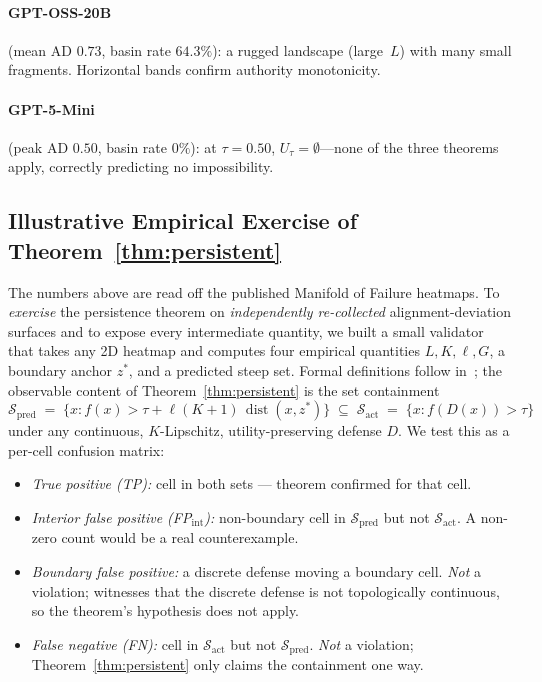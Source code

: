 \documentclass[11pt]{article}
\newcommand{\dist}{\operatorname{dist}}
\begin{document}
\paragraph{GPT-OSS-20B} (mean AD $0.73$, basin rate $64.3\%$): a
rugged landscape (large~$L$) with many small fragments. Horizontal
bands confirm authority monotonicity.

\paragraph{GPT-5-Mini} (peak AD $0.50$, basin rate $0\%$): at
$\tau = 0.50$, $U_\tau = \emptyset$---none of the three theorems
apply, correctly predicting no impossibility.


\subsection{Illustrative Empirical Exercise of Theorem~\ref{thm:persistent}}
\label{sec:live-validation}

The numbers above are read off the published Manifold of Failure
heatmaps. To \emph{exercise} the persistence theorem on
\emph{independently re-collected} alignment-deviation surfaces and
to expose every intermediate quantity, we built a small validator
that takes any 2D heatmap and computes four empirical quantities
$L, K, \ell, G$, a boundary anchor $z^{*}$, and a predicted
steep set. Formal definitions follow in~;
the observable content of Theorem~\ref{thm:persistent} is the
set containment
\[
\mathcal{S}_{\text{pred}} \;=\;
\bigl\{x : f(x) > \tau + \ell(K{+}1)\,\dist(x, z^{*})\bigr\}
\;\subseteq\;
\mathcal{S}_{\text{act}} \;=\; \bigl\{x : f(D(x)) > \tau\bigr\}
\]
under any continuous, $K$-Lipschitz, utility-preserving defense
$D$. We test this as a per-cell confusion matrix:

\begin{itemize}[nosep]
  \item \emph{True positive (TP):} cell in both sets — theorem
    confirmed for that cell.
  \item \emph{Interior false positive (FP$_{\mathrm{int}}$):} non-boundary
    cell in $\mathcal{S}_{\text{pred}}$ but not $\mathcal{S}_{\text{act}}$.
    A non-zero count would be a real counterexample.
  \item \emph{Boundary false positive:} a discrete defense moving a
    boundary cell. \emph{Not} a violation; witnesses that the discrete
    defense is not topologically continuous, so the theorem's
    hypothesis does not apply.
  \item \emph{False negative (FN):} cell in $\mathcal{S}_{\text{act}}$
    but not $\mathcal{S}_{\text{pred}}$. \emph{Not} a violation;
    Theorem~\ref{thm:persistent} only claims the containment one way.
\end{itemize}
\end{document}
